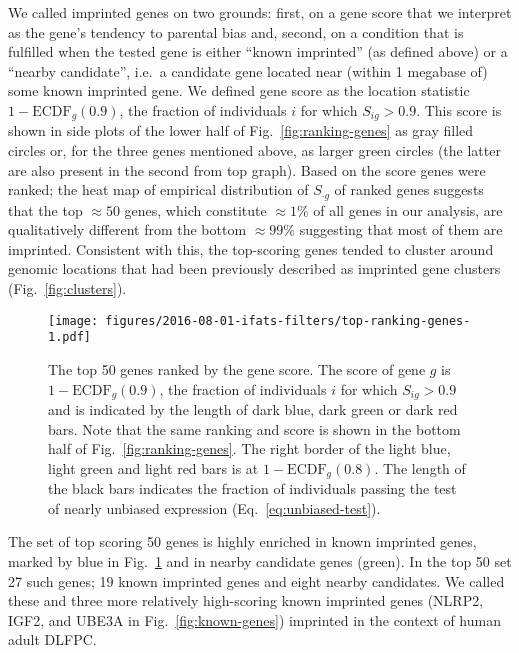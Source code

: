\documentclass[letterpaper]{article}
\begin{document}
We called imprinted genes on two grounds: first, on a gene score that we
interpret as the gene's tendency to parental bias and, second, on a condition
that is fulfilled when the tested gene is either ``known imprinted'' (as
defined above) or a ``nearby candidate'', i.e.~a candidate gene located near
(within 1 megabase of) some known imprinted gene.  We defined gene score as
the location statistic \(1 - \mathrm{ECDF}_g(0.9)\), the fraction of
individuals \(i\) for which \(S_{ig}>0.9\).  This score is shown in side plots
of the lower half of Fig.~\ref{fig:ranking-genes} as gray filled circles or,
for the three genes mentioned above, as larger green circles (the latter are
also present in the second from top graph).  Based on the score genes were
ranked; the heat map of empirical distribution of \(S_{\cdot g}\) of ranked
genes suggests that the top \(\approx 50\) genes, which constitute \(\approx
1\%\) of all genes in our analysis, are qualitatively different from the
bottom \(\approx 99\%\) suggesting that most of them are imprinted.
Consistent with this, the top-scoring genes tended to cluster around genomic
locations that had been previously described as imprinted gene clusters
(Fig.~\ref{fig:clusters}).

\begin{figure}
\begin{center}
\texttt{[image: figures/2016-08-01-ifats-filters/top-ranking-genes-1.pdf]}
\caption{
The top 50 genes ranked by the gene score.  The score of gene \(g\) is \(1 -
\mathrm{ECDF}_g(0.9)\), the fraction of individuals \(i\) for which
\(S_{ig}>0.9\) and is indicated by the length of dark blue, dark green or dark
red bars.  Note that the same ranking and score is shown in the bottom half of
Fig.~\ref{fig:ranking-genes}.  The right border of the light blue, light green
and light red bars is at \(1 - \mathrm{ECDF}_g(0.8)\).  The length of the
black bars indicates the fraction of individuals passing the test of nearly
unbiased expression (Eq.~\ref{eq:unbiased-test}).
}
\label{fig:top-genes}
\end{center}
\end{figure}

The set of top scoring 50 genes is highly enriched in known imprinted genes,
marked by blue in Fig.~\ref{fig:top-genes} and in nearby candidate genes
(green).  In the top 50 set 27 such genes; 19 known imprinted genes and eight
nearby candidates.  We called these and three more relatively high-scoring
known imprinted genes (NLRP2, IGF2, and UBE3A in Fig.~\ref{fig:known-genes})
imprinted in the context of human adult DLFPC.
\end{document}
